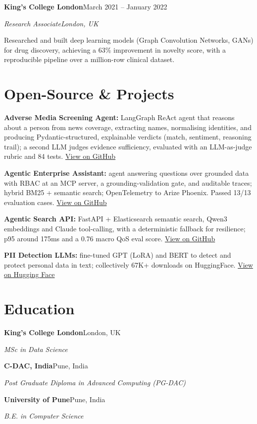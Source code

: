 \documentclass[10pt,a4paper]{article}
\newcommand{\entry}[4]{%
  {\color{company}\bfseries #1}\hfill {\color{muted}#2}\par
  \vspace{1pt}
  {\itshape #3}\hfill {\color{muted}\itshape #4}\par
  \vspace{3pt}%
}
\begin{document}
\entry{King's College London}{March 2021 -- January 2022}{Research Associate}{London, UK}
\begin{tight}
  \item Researched and built deep learning models (Graph Convolution Networks, GANs) for drug discovery, achieving a 63\% improvement in novelty score, with a reproducible pipeline over a million-row clinical dataset.
\end{tight}

\section{Open-Source \& Projects}
\begin{tight}
  \item \textbf{Adverse Media Screening Agent:} LangGraph ReAct agent that reasons about a person from news coverage, extracting names, normalising identities, and producing Pydantic-structured, explainable verdicts (match, sentiment, reasoning trail); a second LLM judges evidence sufficiency, evaluated with an LLM-as-judge rubric and 84 tests. \href{https://github.com/abhijeetscode/adverse-media-screening}{View on GitHub}
  \item \textbf{Agentic Enterprise Assistant:} agent answering questions over grounded data with RBAC at an MCP server, a grounding-validation gate, and auditable traces; hybrid BM25 + semantic search; OpenTelemetry to Arize Phoenix. Passed 13/13 evaluation cases. \href{https://github.com/abhijeetscode/Agentic-Enterprise-Assistant}{View on GitHub}
  \item \textbf{Agentic Search API:} FastAPI + Elasticsearch semantic search, Qwen3 embeddings and Claude tool-calling, with a deterministic fallback for resilience; p95 around 175ms and a 0.76 macro QoS eval score. \href{https://github.com/abhijeetscode/search-agent}{View on GitHub}
  \item \textbf{PII Detection LLMs:} fine-tuned GPT (LoRA) and BERT to detect and protect personal data in text; collectively 67K+ downloads on HuggingFace. \href{https://huggingface.co/ab-ai/pii_model}{View on Hugging Face}
\end{tight}

\section{Education}
{\color{company}\bfseries King's College London}\hfill {\color{muted}London, UK}\par
{\itshape MSc in Data Science}\par\vspace{2pt}
{\color{company}\bfseries C-DAC, India}\hfill {\color{muted}Pune, India}\par
{\itshape Post Graduate Diploma in Advanced Computing (PG-DAC)}\par\vspace{2pt}
{\color{company}\bfseries University of Pune}\hfill {\color{muted}Pune, India}\par
{\itshape B.E. in Computer Science}\par
\end{document}
